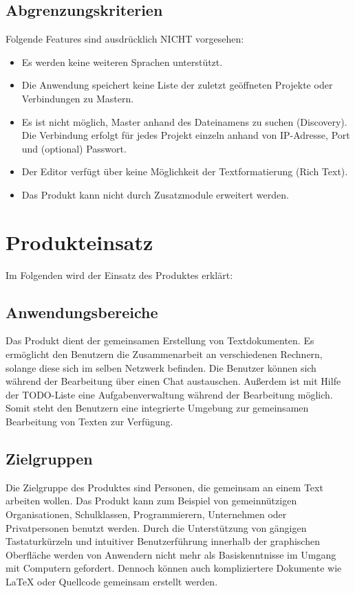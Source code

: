 \documentclass{scrartcl}
\begin{document}
\subsection{Abgrenzungskriterien}
Folgende Features sind ausdrücklich NICHT vorgesehen:
\begin{itemize}
\item Es werden keine weiteren Sprachen unterstützt.
\item Die Anwendung speichert keine Liste der zuletzt geöffneten Projekte oder Verbindungen zu Mastern.
\item Es ist nicht möglich, Master anhand des Dateinamens zu suchen (Discovery). Die Verbindung erfolgt für jedes Projekt einzeln anhand von IP-Adresse, Port und (optional) Passwort.
\item Der Editor verfügt über keine Möglichkeit der Textformatierung (Rich Text).
\item Das Produkt kann nicht durch Zusatzmodule erweitert werden.
\end{itemize}

\section{Produkteinsatz}
Im Folgenden wird der Einsatz des Produktes erklärt:

\subsection{Anwendungsbereiche}
Das Produkt dient der gemeinsamen Erstellung von Textdokumenten. Es ermöglicht den Benutzern die Zusammenarbeit an verschiedenen Rechnern, solange diese sich im selben Netzwerk befinden. Die Benutzer können sich während der Bearbeitung über einen Chat austauschen. Außerdem ist mit Hilfe der TODO-Liste eine Aufgabenverwaltung während der Bearbeitung möglich. Somit steht den Benutzern eine integrierte Umgebung zur gemeinsamen Bearbeitung von Texten zur Verfügung.

\subsection{Zielgruppen}
Die Zielgruppe des Produktes sind Personen, die gemeinsam an einem Text arbeiten wollen. Das Produkt kann zum Beispiel von gemeinnützigen Organisationen, Schulklassen, Programmierern, Unternehmen oder Privatpersonen benutzt werden. Durch die Unterstützung von gängigen Tastaturkürzeln und intuitiver Benutzerführung innerhalb der graphischen Oberfläche werden von Anwendern nicht mehr als Basiskenntnisse im Umgang mit Computern gefordert. Dennoch können auch kompliziertere Dokumente wie LaTeX oder Quellcode gemeinsam erstellt werden.
\end{document}
